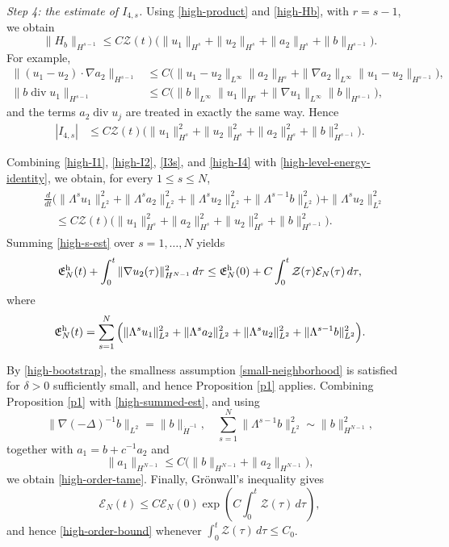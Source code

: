 \documentclass[10pt,reqno]{amsart}
\numberwithin{equation}{section}
\begin{document}
\medskip
\noindent\emph{Step 4: the estimate of $I_{4,s}$.}
Using \eqref{high-product} and \eqref{high-Hb}, with $r=s-1$, we obtain
\[%
\|H_b\|_{H^{s-1}} \le C\mathcal Z(t)\Big( \|u_1\|_{H^s}+\|u_2\|_{H^s}+\|a_2\|_{H^s}+\|b\|_{H^{s-1}} \Big).
\]%
For example,
\begin{align*}
\|(u_1-u_2)\cdot\nabla a_2\|_{H^{s-1}}
&\le C\big(\|u_1-u_2\|_{L^\infty}\|a_2\|_{H^s}
+\|\nabla a_2\|_{L^\infty}\|u_1-u_2\|_{H^{s-1}}\big),\\
\|b\operatorname{div}u_1\|_{H^{s-1}}
&\le C\big(\|b\|_{L^\infty}\|u_1\|_{H^s}
+\|\nabla u_1\|_{L^\infty}\|b\|_{H^{s-1}}\big),
\end{align*}
and the terms $a_2\operatorname{div}u_j$ are treated in exactly the same way.
Hence
\begin{align}\label{high-I4}
|I_{4,s}|
&\le C\mathcal Z(t)\Big(
\|u_1\|_{H^s}^2+\|u_2\|_{H^s}^2+\|a_2\|_{H^s}^2
+\|b\|_{H^{s-1}}^2\Big).
\end{align}

Combining \eqref{high-I1}, \eqref{high-I2}, \eqref{I3s}, and
\eqref{high-I4} with \eqref{high-level-energy-identity}, we obtain, for every
$1\le s\le N$,
\begin{align}\label{high-s-est}
\begin{aligned}
&\frac{d}{dt}\Big( \|\Lambda^su_1\|_{L^2}^2+\|\Lambda^sa_2\|_{L^2}^2 +\|\Lambda^su_2\|_{L^2}^2+\|\Lambda^{s-1}b\|_{L^2}^2\Big) +\|\Lambda^su_2\|_{L^2}^2\\
&\quad\le C\mathcal Z(t)\Big( \|u_1\|_{H^s}^2+\|a_2\|_{H^s}^2+\|u_2\|_{H^s}^2 +\|b\|_{H^{s-1}}^2\Big).
\end{aligned}
\end{align}
Summing \eqref{high-s-est} over $s=1,\ldots,N$ yields
\begin{align}\label{high-summed-est}
\mathfrak E_N^{\rm h}(t)
+\int_0^t\|\nabla u_2(\tau)\|_{H^{N-1}}^2\,d\tau\le \mathfrak E_N^{\rm h}(0)
+C\int_0^t\mathcal Z(\tau)\mathcal E_N(\tau)\,d\tau,
\end{align}
where
\begin{align*}
\mathfrak E_N^{\rm h}(t)
=\sum_{s=1}^N\Big(
\|\Lambda^su_1\|_{L^2}^2+\|\Lambda^sa_2\|_{L^2}^2
+\|\Lambda^su_2\|_{L^2}^2+\|\Lambda^{s-1}b\|_{L^2}^2\Big).
\end{align*}

By \eqref{high-bootstrap}, the smallness assumption \eqref{small-neighborhood}
is satisfied for $\delta>0$ sufficiently small, and hence
Proposition \ref{p1} applies. Combining Proposition \ref{p1} with
\eqref{high-summed-est}, and using
\[
\|\nabla(-\Delta)^{-1}b\|_{L^2}=\|b\|_{\dot H^{-1}},\quad
\sum_{s=1}^N\|\Lambda^{s-1}b\|_{L^2}^2\sim\|b\|_{H^{N-1}}^2,
\]
together with $a_1=b+c^{-1}a_2$ and
\[
\|a_1\|_{H^{N-1}}
\le C\big(\|b\|_{H^{N-1}}+\|a_2\|_{H^{N-1}}\big),
\]
we obtain \eqref{high-order-tame}. Finally, Gr\"onwall's inequality gives
\[
\mathcal E_N(t)
\le C\mathcal E_N(0)
\exp\left(C\int_0^t\mathcal Z(\tau)\,d\tau\right),
\]
and hence \eqref{high-order-bound} whenever
$\int_0^t\mathcal Z(\tau)\,d\tau\le C_0$.
\endproof
\end{document}
